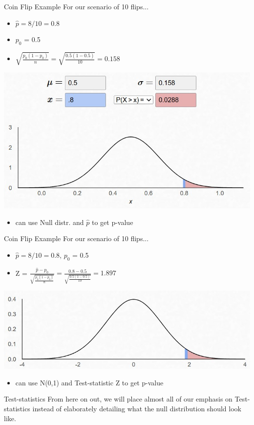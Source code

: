 \documentclass{beamer}
\begin{document}
\begin{frame}{Coin Flip Example}
For our scenario of 10 flips...
\begin{itemize}
    \item $\hat{p} = 8 / 10 = 0.8$
    \item $p_0$ = 0.5
    \item $\sqrt{\frac{p_0(1 - p_0)}{n}} = \sqrt{\frac{0.5(1 - 0.5)}{10}} = 0.158$
\end{itemize}
\begin{center}
    \includegraphics[scale=.65]{img/coin_null_distr3.jpg}
\end{center}
\begin{itemize}
    \item can use Null distr. and $\hat{p}$ to get p-value
\end{itemize}

\end{frame}

\begin{frame}{Coin Flip Example}
For our scenario of 10 flips...
\begin{itemize}
    \item $\hat{p} = 8 / 10 = 0.8$, $p_0$ = 0.5
    \item Z = $\frac{\widehat{p}-p_0}{\sqrt{\frac{p_0(1 - p_0)}{n}}} = \frac{0.8-0.5}{\sqrt{\frac{0.5(1 - 0.5)}{10}}} = 1.897$
\end{itemize}
\begin{center}
    \includegraphics[scale=.75]{img/coin_null_distr4.jpg}
\end{center}
\begin{itemize}
    \item can use N(0,1) and Test-statistic Z to get p-value
\end{itemize}
\end{frame}

\begin{frame}{Test-statistics}
From here on out, we will place almost all of our emphasis on Test-statistics instead of elaborately detailing what the null distribution should look like.
\end{frame}
\end{document}
